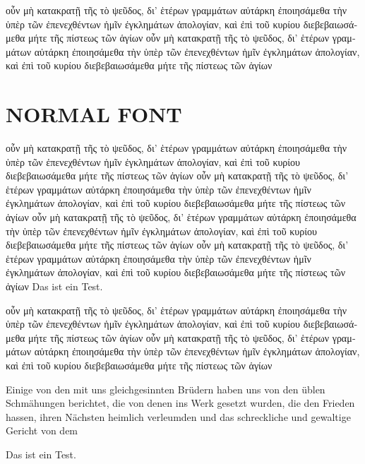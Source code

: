 \documentclass{memoir}
\begin{document}
\begin{greek}
\beginnumbering
\pstart
οὖν μὴ κατακρατῇ τῆς 
  τὸ ψεῦδος, δι’ ἑτέρων γραμμάτων αὐτάρκη ἐποιησάμεθα τὴν ὑπὲρ τῶν
  ἐπενεχθέντων ἡμῖν ἐγκλημάτων ἀπολογίαν, καὶ ἐπὶ τοῦ κυρίου
  διεβεβαιωσάμεθα μήτε τῆς πίστεως τῶν ἁγίων
οὖν μὴ κατακρατῇ τῆς 
  τὸ ψεῦδος, δι’ ἑτέρων γραμμάτων αὐτάρκη ἐποιησάμεθα τὴν ὑπὲρ τῶν
  ἐπενεχθέντων ἡμῖν ἐγκλημάτων ἀπολογίαν, καὶ ἐπὶ τοῦ κυρίου
  διεβεβαιωσάμεθα μήτε τῆς πίστεως τῶν ἁγίων
  \pend
\endnumbering
\end{greek}
\section{NORMAL FONT}
\beginnumbering
\pstart
οὖν μὴ κατακρατῇ τῆς 
  τὸ ψεῦδος, δι’ ἑτέρων γραμμάτων αὐτάρκη ἐποιησάμεθα τὴν ὑπὲρ τῶν
  ἐπενεχθέντων ἡμῖν ἐγκλημάτων ἀπολογίαν, καὶ ἐπὶ τοῦ κυρίου
  διεβεβαιωσάμεθα μήτε τῆς πίστεως τῶν ἁγίων
οὖν μὴ κατακρατῇ τῆς 
  τὸ ψεῦδος, δι’ ἑτέρων γραμμάτων αὐτάρκη ἐποιησάμεθα τὴν ὑπὲρ τῶν
  ἐπενεχθέντων ἡμῖν ἐγκλημάτων ἀπολογίαν, καὶ ἐπὶ τοῦ κυρίου
  διεβεβαιωσάμεθα μήτε τῆς πίστεως τῶν ἁγίων
  \pend
\endnumbering
\beginnumbering
\pstart
οὖν μὴ κατακρατῇ τῆς 
  τὸ ψεῦδος, δι’ ἑτέρων γραμμάτων αὐτάρκη ἐποιησάμεθα τὴν ὑπὲρ τῶν
  ἐπενεχθέντων ἡμῖν ἐγκλημάτων ἀπολογίαν, καὶ ἐπὶ τοῦ κυρίου
  διεβεβαιωσάμεθα μήτε τῆς πίστεως τῶν ἁγίων
οὖν μὴ κατακρατῇ τῆς 
  τὸ ψεῦδος, δι’ ἑτέρων γραμμάτων αὐτάρκη ἐποιησάμεθα τὴν ὑπὲρ τῶν
  ἐπενεχθέντων ἡμῖν ἐγκλημάτων ἀπολογίαν, καὶ ἐπὶ τοῦ κυρίου
  διεβεβαιωσάμεθα μήτε τῆς πίστεως τῶν ἁγίων
  \pend
\endnumbering
Das ist ein Test.
\begin{pairs}
\begin{Leftside}
\begin{greek}
\beginnumbering
\pstart
οὖν μὴ κατακρατῇ τῆς 
  τὸ ψεῦδος, δι’ ἑτέρων γραμμάτων αὐτάρκη ἐποιησάμεθα τὴν ὑπὲρ τῶν
  ἐπενεχθέντων ἡμῖν ἐγκλημάτων ἀπολογίαν, καὶ ἐπὶ τοῦ κυρίου
  διεβεβαιωσάμεθα μήτε τῆς πίστεως τῶν ἁγίων
οὖν μὴ κατακρατῇ τῆς 
  τὸ ψεῦδος, δι’ ἑτέρων γραμμάτων αὐτάρκη ἐποιησάμεθα τὴν ὑπὲρ τῶν
  ἐπενεχθέντων ἡμῖν ἐγκλημάτων ἀπολογίαν, καὶ ἐπὶ τοῦ κυρίου
  διεβεβαιωσάμεθα μήτε τῆς πίστεως τῶν ἁγίων
  \pend
\endnumbering
\end{greek}
\end{Leftside}
\begin{Rightside}
    \beginnumbering
    \pstart
    Einige von den mit uns gleichgesinnten Brüdern haben uns von den üblen Schmähungen berichtet, die von denen ins Werk gesetzt wurden, die den Frieden hassen, ihren Nächsten heimlich verleumden und das schreckliche und gewaltige Gericht von dem
    \pend
    \endnumbering
\end{Rightside}
\end{pairs}
\Columns
Das ist ein Test.
\end{document}
